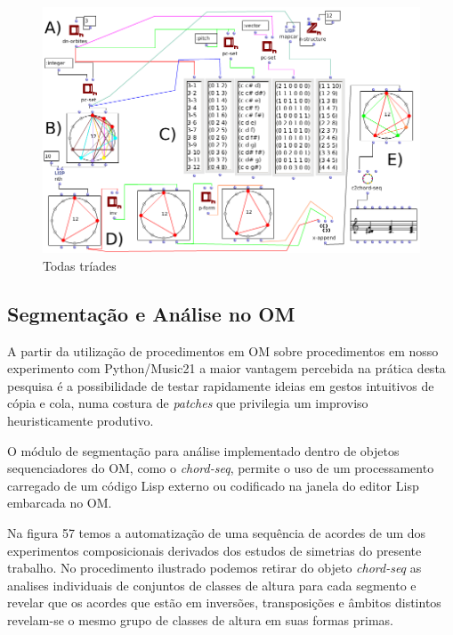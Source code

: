 \documentclass[
	12pt,				%
	openright,			%
	twoside,			%
	a4paper,			%
	english,			%
	french,				%
	spanish,			%
	brazil				%
	]{abntex2}
\begin{document}
\begin{figure}[!h]
	\caption{\label{fig_grafico}Todas tríades }
	\begin{center}
	    \includegraphics[scale=0.5]{OM_settheory/todas_triades.png}
	\end{center}
\end{figure}

\pagebreak
\subsection{Segmentação e Análise no OM}

A partir da utilização de procedimentos em OM sobre procedimentos em nosso experimento com Python/Music21 a maior vantagem percebida na prática desta pesquisa é a possibilidade de testar rapidamente ideias em gestos intuitivos de cópia e cola, numa costura de \textit{patches} que privilegia um improviso heuristicamente produtivo. 

O módulo de segmentação para análise implementado dentro de objetos sequenciadores do OM, como o \textit{chord-seq}, permite o uso de um processamento carregado de um código Lisp externo ou codificado na janela do editor Lisp embarcada no OM. 

Na figura 57 temos a automatização de uma sequência de acordes de um dos experimentos composicionais derivados dos estudos de simetrias do presente trabalho. No procedimento ilustrado podemos retirar do objeto \textit{chord-seq} as analises individuais de conjuntos de classes de altura para cada segmento e revelar que os acordes que estão em inversões, transposições e âmbitos distintos revelam-se o mesmo grupo de classes de altura em suas formas primas.
\end{document}
